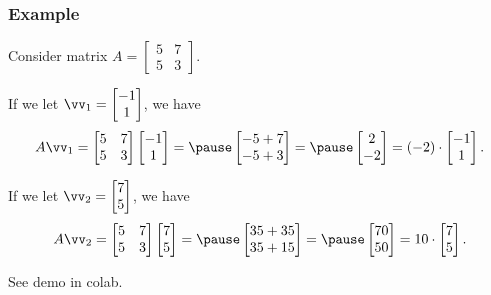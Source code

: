 \begin{frame}\
  \frametitle{Example}
  Consider matrix $A=\begin{bmatrix}5 & 7 \\ 5 & 3\end{bmatrix}$.

  If we let $\vv_1=\begin{bmatrix}-1 \\ 1\end{bmatrix}$, we have
  \[
  A\vv_1=
  \begin{bmatrix}
    5 & 7 \\ 5 & 3
  \end{bmatrix}
  \begin{bmatrix}
    -1 \\ 1
  \end{bmatrix}
  = \pause
  \begin{bmatrix}
    -5+7 \\ -5 + 3
  \end{bmatrix}
  = \pause
  \begin{bmatrix}
    2 \\ -2
  \end{bmatrix}
  =
  (-2)\cdot
  \begin{bmatrix}
    -1 \\ 1
  \end{bmatrix}.
  \]

  If we let $\vv_2=\begin{bmatrix}7 \\ 5\end{bmatrix}$, we have
  \[
  A\vv_2=
  \begin{bmatrix}
    5 & 7 \\ 5 & 3
  \end{bmatrix}
  \begin{bmatrix}
    7 \\ 5
  \end{bmatrix}
  = \pause
  \begin{bmatrix}
    35+35 \\ 35 + 15
  \end{bmatrix}
  = \pause
  \begin{bmatrix}
    70 \\ 50
  \end{bmatrix}
  =
  10\cdot
  \begin{bmatrix}
    7 \\ 5
  \end{bmatrix}.
  \]

  \pause
  See demo in colab.
\end{frame}

